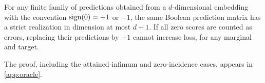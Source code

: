 \begin{lemma}\label{lem:ties}
For any finite family of predictions obtained from a $d$-dimensional embedding with the convention $\operatorname{sign}(0)=+1$ or $-1$, the same Boolean prediction matrix has a strict realization in dimension at most $d+1$. If all zero scores are counted as errors, replacing their predictions by $+1$ cannot increase loss, for any marginal and target.
\end{lemma}
\noindent The proof, including the attained-infimum and zero-incidence cases, appears in \cref{app:oracle}.
